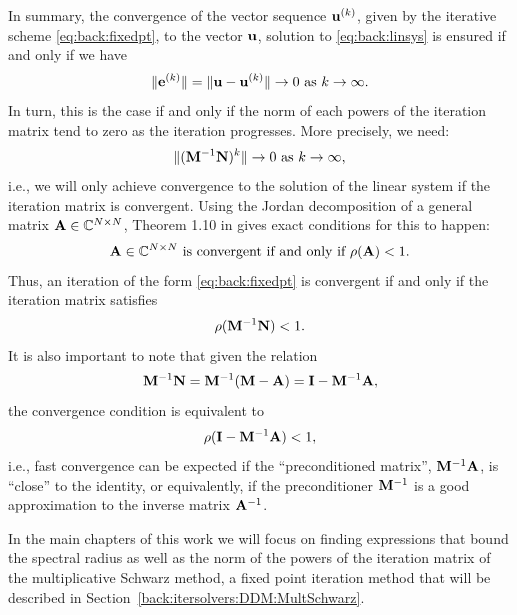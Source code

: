In summary, the convergence of the vector sequence $\mathbf{u}^{(k)}$, given by the iterative scheme \eqref{eq:back:fixedpt}, to the vector $\mathbf{u}$, solution to \eqref{eq:back:linsys} is ensured if and only if we have
\begin{equation*}
\|\mathbf{e}^{(k)}\|=\|\mathbf{u}-\mathbf{u}^{(k)}\|\to0\text{ as } k\to\infty.
\end{equation*}
In turn, this is the case if and only if the norm of each powers of the iteration matrix tend to zero as the iteration progresses. More precisely, we need:
\begin{equation*}
\|(\mathbf{M}^{-1}\mathbf{N})^{k}\|\to0\text{ as } k\to\infty,
\end{equation*}
i.e., we will only achieve convergence to the solution of the linear system if the iteration matrix is convergent. Using the Jordan decomposition of a general matrix $\mathbf{A}\in\mathbb{C}^{N\times N}$, Theorem 1.10 in \cite{Var09} gives exact conditions for this to happen:
\begin{equation}
\mathbf{A}\in\mathbb{C}^{N\times N}\text{ is convergent if and only if } \rho(\mathbf{A})<1.
\label{eq:back:convergence}
\end{equation}
Thus, an iteration of the form \eqref{eq:back:fixedpt} is convergent if and only if the iteration matrix satisfies
\begin{equation}
\rho(\mathbf{M}^{-1}\mathbf{N})<1.
\end{equation}
It is also important to note that given the relation
\begin{equation*}
\label{eq:back:itermat}
\mathbf{M}^{-1}\mathbf{N} = \mathbf{M}^{-1}(\mathbf{M}-\mathbf{A}) = \mathbf{I} - \mathbf{M}^{-1}\mathbf{A},
\end{equation*}
the convergence condition is equivalent to
\[
\rho( \mathbf{I} - \mathbf{M}^{-1}\mathbf{A} )< 1,
\]
i.e., fast convergence can be expected if the ``preconditioned matrix'',
$\mathbf{M}^{-1}\mathbf{A}$, is ``close'' to the identity, or equivalently, if the preconditioner $\mathbf{M}^{-1}$ is a good approximation to the inverse matrix $\mathbf{A}^{-1}$.

In the main chapters of this work we will focus on finding expressions that bound the spectral radius as well as the norm of the powers of the iteration matrix of the multiplicative Schwarz method, a fixed point iteration method that will be described in Section~\ref{back:itersolvers:DDM:MultSchwarz}.



